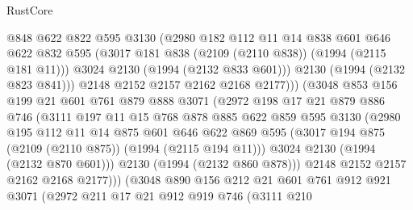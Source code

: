 \begin{lexlean}{RustCore}
\begin{coremodule}
                      @848
                      @622
                      @822
                      @595
                      @3130
                      (@2980
                        @182
                        @112
                        @11
                        @14
                        @838
                        @601
                        @646
                        @622
                        @832
                        @595
                        (@3017 @181 @838 (@2109 (@2110 @838)) (@1994 (@2115 @181 @11)))
                        @3024
                        @2130
                        (@1994 (@2132 @833 @601)))
                      @2130
                      (@1994 (@2132 @823 @841)))
                    @2148
                    @2152
                    @2157
                    @2162
                    @2168
                    @2177)))
              (@3048
                @853
                @156
                @199
                @21
                @601
                @761
                @879
                @888
                @3071
                (@2972
                  @198
                  @17
                  @21
                  @879
                  @886
                  @746
                  (@3111
                    @197
                    @11
                    @15
                    @768
                    @878
                    @885
                    @622
                    @859
                    @595
                    @3130
                    (@2980
                      @195
                      @112
                      @11
                      @14
                      @875
                      @601
                      @646
                      @622
                      @869
                      @595
                      (@3017 @194 @875 (@2109 (@2110 @875)) (@1994 (@2115 @194 @11)))
                      @3024
                      @2130
                      (@1994 (@2132 @870 @601)))
                    @2130
                    (@1994 (@2132 @860 @878)))
                  @2148
                  @2152
                  @2157
                  @2162
                  @2168
                  @2177)))
            (@3048
              @890
              @156
              @212
              @21
              @601
              @761
              @912
              @921
              @3071
              (@2972
                @211
                @17
                @21
                @912
                @919
                @746
                (@3111
                  @210

\end{coremodule}
\end{lexlean}
